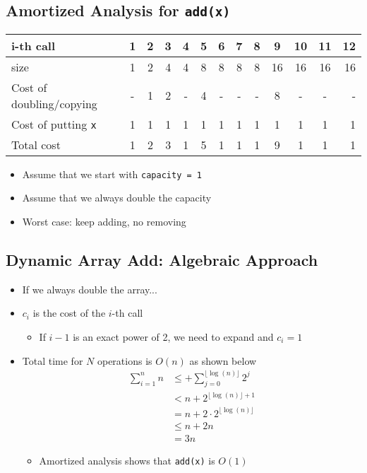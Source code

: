 \documentclass[10pt]{article}
\begin{document}
\subsection*{Amortized Analysis for \texttt{add(x)}}

\begin{center}
    \begin{tabular}{lcccccccccccr} \toprule
        i-th call & 1 & 2 & 3 & 4 & 5 & 6 & 7 & 8 & 9 & 10 & 11 & 12 \\ \midrule
        size & 1 & 2 & 4 & 4 & 8 & 8 & 8 & 8 & 16 & 16 & 16 & 16 \\
        Cost of doubling/copying & - & 1 & 2 & - & 4 & - & - & - & 8 & - & - & - \\
        Cost of putting \texttt{x} & 1 & 1 & 1 & 1 & 1 & 1 & 1 & 1 & 1 & 1 & 1 & 1 \\ \midrule
        Total cost & 1 & 2 & 3 & 1 & 5 & 1 & 1 & 1 & 9 & 1 & 1 & 1 \\ \bottomrule
    \end{tabular}
\end{center}
\begin{itemize}
    \item Assume that we start with \texttt{capacity = 1}
    \item Assume that we always double the capacity
    \item Worst case: keep adding, no removing
\end{itemize}

\subsection*{Dynamic Array Add: Algebraic Approach}
\begin{itemize}
    \item If we always double the array...
    \item $c_i$ is the cost of the $i$-th call
    \begin{itemize}
        \item If $i-1$ is an exact power of 2, we need to expand and $c_i = 1$
    \end{itemize}
    \item Total time for $N$ operations is $O(n)$ as shown below
    \begin{align*}
        \sum_{i=1}^n n &\leq + \sum_{j=0}^{\lfloor \log(n)\rfloor} 2^j \\
        &< n + 2^{\lfloor \log(n) \rfloor + 1} \\
        & = n + 2\cdot 2^{\lfloor \log(n) \rfloor} \\
        &\leq n+2n \\
        &= 3n
    \end{align*}
    \begin{itemize}
        \item Amortized analysis shows that \texttt{add(x)} is $O(1)$
    \end{itemize}
\end{itemize}
\end{document}
